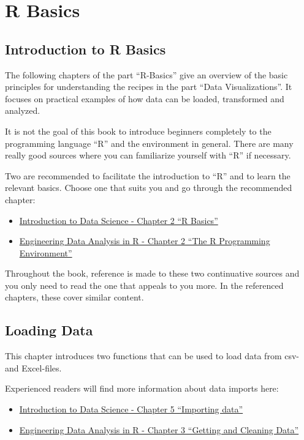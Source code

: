 \documentclass[
  a4paperpaper,
]{book}
\providecommand{\tightlist}{%
  \setlength{\itemsep}{0pt}\setlength{\parskip}{0pt}}
\begin{document}
\hypertarget{part-r-basics}{%
\part{R Basics}\label{part-r-basics}}

\hypertarget{introduction-to-r-basics}{%
\chapter{Introduction to R Basics}\label{introduction-to-r-basics}}

The following chapters of the part ``R-Basics'' give an overview of the basic principles for understanding the recipes in the part ``Data Visualizations''. It focuses on practical examples of how data can be loaded, transformed and analyzed.

It is not the goal of this book to introduce beginners completely to the programming language ``R'' and the environment in general. There are many really good sources where you can familiarize yourself with ``R'' if necessary.

Two are recommended to facilitate the introduction to ``R'' and to learn the relevant basics. Choose one that suits you and go through the recommended chapter:

\begin{itemize}
\tightlist
\item
  \href{https://rafalab.github.io/dsbook/r-basics.html}{Introduction to Data Science - Chapter 2 ``R Basics''}
\item
  \href{https://smogdr.github.io/edar_coursebook/rprog1.html}{Engineering Data Analysis in R - Chapter 2 ``The R Programming Environment''}
\end{itemize}

Throughout the book, reference is made to these two continuative sources and you only need to read the one that appeals to you more. In the referenced chapters, these cover similar content.

\hypertarget{loading-data}{%
\chapter{Loading Data}\label{loading-data}}

This chapter introduces two functions that can be used to load data from csv- and Excel-files.

Experienced readers will find more information about data imports here:

\begin{itemize}
\item
  \href{https://rafalab.github.io/dsbook/importing-data.html}{Introduction to Data Science - Chapter 5 ``Importing data''}
\item
  \href{https://smogdr.github.io/edar_coursebook/rprog2.html}{Engineering Data Analysis in R - Chapter 3 ``Getting and Cleaning Data''}
\end{itemize}
\end{document}
